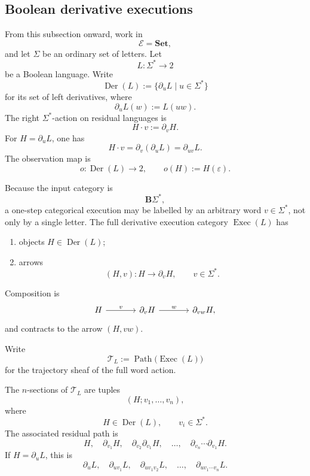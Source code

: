\subsection{Boolean derivative executions}
\label{subsec:boolean-language-trajectories}

From this subsection onward, work in
\[
    \mathcal E=\mathbf{Set},
\]
and let \(\Sigma\) be an ordinary set of letters. Let
\[
    L:\Sigma^\ast\to2
\]
be a Boolean language. Write
\[
    \operatorname{Der}(L)
    :=
    \{
        \partial_uL
        \mid
        u\in\Sigma^\ast
    \}
\]
for its set of left derivatives, where
\[
    \partial_uL(w):=L(uw).
\]
The right \(\Sigma^\ast\)-action on residual languages is
\[
    H\cdot v:=\partial_vH.
\]
For \(H=\partial_uL\), one has
\[
    H\cdot v
    =
    \partial_v(\partial_uL)
    =
    \partial_{uv}L.
\]
The observation map is
\[
    o:\operatorname{Der}(L)\to2,
    \qquad
    o(H):=H(\varepsilon).
\]

Because the input category is
\[
    \mathbf B\Sigma^\ast,
\]
a one-step categorical execution may be labelled by an arbitrary word
\(v\in\Sigma^\ast\), not only by a single letter. The full derivative
execution category \(\operatorname{Exec}(L)\) has
\begin{enumerate}
    \item objects \(H\in\operatorname{Der}(L)\);
    \item arrows
    \[
        (H,v):
        H\to\partial_vH,
        \qquad
        v\in\Sigma^\ast.
    \]
\end{enumerate}
Composition is
\[
\begin{tikzcd}[column sep=large]
    H
        \arrow[r, "v"]
    &
    \partial_vH
        \arrow[r, "w"]
    &
    \partial_{vw}H,
\end{tikzcd}
\]
and contracts to the arrow \((H,vw)\).

Write
\[
    \mathscr T_L
    :=
    \operatorname{Path}
    \bigl(
        \operatorname{Exec}(L)
    \bigr)
\]
for the trajectory sheaf of the full word action.

\begin{proposition}
\label{prop:temporal-derivative-automaton}
The \(n\)-sections of \(\mathscr T_L\) are tuples
\[
    (H;v_1,\ldots,v_n),
\]
where
\[
    H\in\operatorname{Der}(L),
    \qquad
    v_i\in\Sigma^\ast.
\]
The associated residual path is
\[
    H,
    \quad
    \partial_{v_1}H,
    \quad
    \partial_{v_2}\partial_{v_1}H,
    \quad
    \ldots,
    \quad
    \partial_{v_n}\cdots\partial_{v_1}H.
\]
If \(H=\partial_uL\), this is
\[
    \partial_uL,
    \quad
    \partial_{uv_1}L,
    \quad
    \partial_{uv_1v_2}L,
    \quad
    \ldots,
    \quad
    \partial_{uv_1\cdots v_n}L.
\]
\end{proposition}

